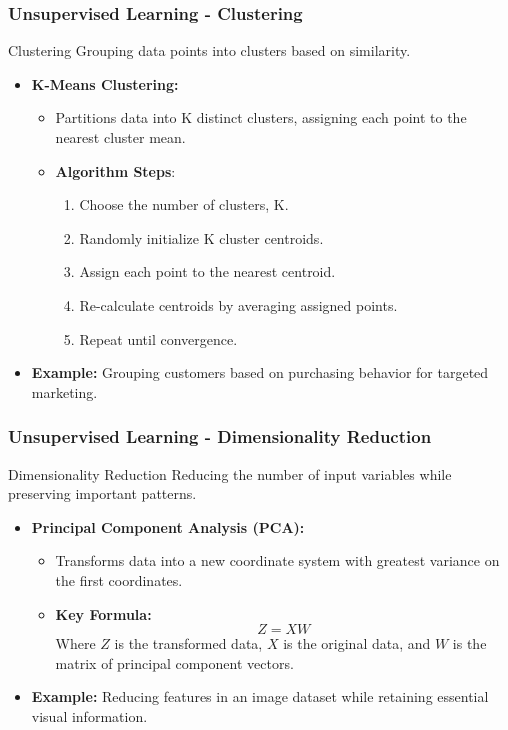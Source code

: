 \documentclass[aspectratio=169]{beamer}
\begin{document}
\begin{frame}[fragile]
    \frametitle{Unsupervised Learning - Clustering}
    \begin{block}{Clustering}
        Grouping data points into clusters based on similarity.
    \end{block}
    \begin{itemize}
        \item \textbf{K-Means Clustering:}
        \begin{itemize}
            \item Partitions data into K distinct clusters, assigning each point to the nearest cluster mean.
            \item \textbf{Algorithm Steps}:
            \begin{enumerate}
                \item Choose the number of clusters, K.
                \item Randomly initialize K cluster centroids.
                \item Assign each point to the nearest centroid.
                \item Re-calculate centroids by averaging assigned points.
                \item Repeat until convergence.
            \end{enumerate}
        \end{itemize}
        \item \textbf{Example:} Grouping customers based on purchasing behavior for targeted marketing.
    \end{itemize}
\end{frame}

\begin{frame}[fragile]
    \frametitle{Unsupervised Learning - Dimensionality Reduction}
    \begin{block}{Dimensionality Reduction}
        Reducing the number of input variables while preserving important patterns.
    \end{block}
    \begin{itemize}
        \item \textbf{Principal Component Analysis (PCA):}
        \begin{itemize}
            \item Transforms data into a new coordinate system with greatest variance on the first coordinates.
            \item \textbf{Key Formula:}
            \begin{equation}
                Z = XW
            \end{equation}
            Where \( Z \) is the transformed data, \( X \) is the original data, and \( W \) is the matrix of principal component vectors.
        \end{itemize}
        \item \textbf{Example:} Reducing features in an image dataset while retaining essential visual information.
    \end{itemize}
\end{frame}
\end{document}
